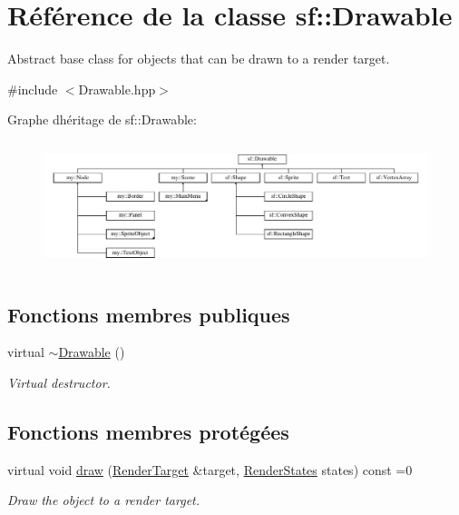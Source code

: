 \hypertarget{classsf_1_1Drawable}{}\section{Référence de la classe sf\+:\+:Drawable}
\label{classsf_1_1Drawable}


Abstract base class for objects that can be drawn to a render target.  




{\ttfamily \#include $<$Drawable.\+hpp$>$}

Graphe d\textquotesingle{}héritage de sf\+:\+:Drawable\+:\begin{figure}[H]
\begin{center}
\leavevmode
\includegraphics[height=3.750000cm]{classsf_1_1Drawable}
\end{center}
\end{figure}
\subsection*{Fonctions membres publiques}
\begin{DoxyCompactItemize}
\item 
\mbox{\label{classsf_1_1Drawable_a906002f2df7beb5edbddf5bbef96f120}} 
virtual \hyperlink{classsf_1_1Drawable_a906002f2df7beb5edbddf5bbef96f120}{$\sim$\+Drawable} ()
\begin{DoxyCompactList}\small\item\em Virtual destructor. \end{DoxyCompactList}\end{DoxyCompactItemize}
\subsection*{Fonctions membres protégées}
\begin{DoxyCompactItemize}
\item 
virtual void \hyperlink{classsf_1_1Drawable_a90d2c88bba9b035a0844eccb380ef631}{draw} (\hyperlink{classsf_1_1RenderTarget}{Render\+Target} \&target, \hyperlink{classsf_1_1RenderStates}{Render\+States} states) const =0
\begin{DoxyCompactList}\small\item\em Draw the object to a render target. \end{DoxyCompactList}\end{DoxyCompactItemize}
